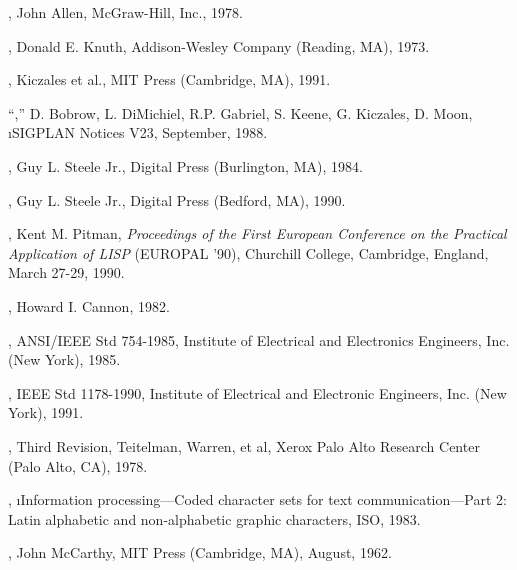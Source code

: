 


\beginlist

\item{\bull} {\AnatomyOfLisp},
        John Allen, McGraw-Hill, Inc., 1978.


\item{\bull} {\KnuthVolThree},
             Donald E. Knuth, Addison-Wesley Company (Reading, MA), 1973.

\item{\bull} {\MetaObjectProtocol},
	Kiczales et al., MIT Press (Cambridge, MA), 1991.

\item{\bull} ``\CLOSPaper,''
        D. Bobrow, L. DiMichiel, R.P. Gabriel, S. Keene, G. Kiczales, D. Moon,
        \i{SIGPLAN Notices} V23, September, 1988.

\item{\bull} {\CLtL},
        Guy L. Steele Jr., Digital Press (Burlington, MA), 1984.

\item{\bull} {\CLtLTwo},
        Guy L. Steele Jr., Digital Press (Bedford, MA), 1990.

\item{\bull} {\CondSysPaper},
	Kent M. Pitman,
	{\it Proceedings of the First European Conference
	     on the Practical Application of LISP\/}
        (EUROPAL '90),
	Churchill College, Cambridge, England,
	March 27-29, 1990.

\item{\bull} {\FlavorsPaper},
	Howard I. Cannon, 1982.

\item{\bull} {\IEEEFloatingPoint},
        ANSI/IEEE Std 754-1985,
        Institute of Electrical and Electronics Engineers, Inc. (New York), 1985.

\item{\bull} {\IEEEScheme},
	IEEE Std 1178-1990,
	Institute of Electrical and Electronic Engineers, Inc. (New York), 1991.

\item{\bull} {\InterlispManual}, Third Revision,
	Teitelman, Warren, et al,
	Xerox Palo Alto Research Center (Palo Alto, CA), 1978.

\item{\bull} \ISOChars,
	\i{Information processing---Coded character sets 
           for text communication---Part 2: Latin alphabetic and non-alphabetic
           graphic characters}, 
	ISO, 1983.

\item{\bull} {\LispOnePointFive},
	John McCarthy, MIT Press (Cambridge, MA), August, 1962.

